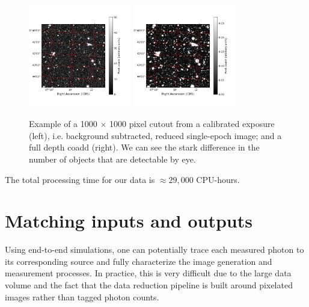 \documentclass[\docopts]{\docclass}
\begin{document}
\begin{figure}
\centering
\includegraphics[width=0.4\textwidth]{calexp_example.png}
\includegraphics[width=0.4\textwidth]{coadd_example.png}
\caption{Example of a 1000 $\times$ 1000 pixel cutout from a calibrated exposure (left), i.e. background subtracted, reduced single-epoch image; and a full depth coadd (right). We can see the stark difference in the number of objects that are detectable by eye.}
\label{fig:coadd_example}
\end{figure}

The total processing time for our data is $\approx 29,000$ CPU-hours.

\section{Matching inputs and outputs}
\label{sec:matching}

Using end-to-end simulations, one can potentially trace each measured photon to its corresponding source and fully characterize the image generation and measurement processes. In practice, this is very difficult due to the large data volume and the fact that the data reduction pipeline is built around pixelated images rather than tagged photon counts.
\end{document}
